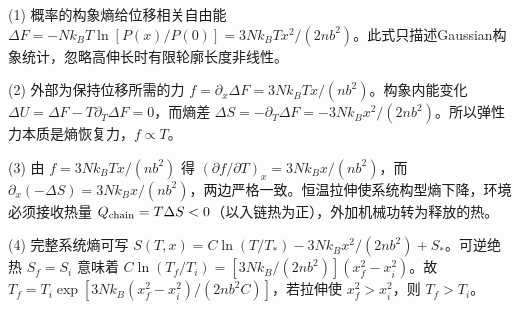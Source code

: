 (1) 概率的构象熵给位移相关自由能 \(\Delta F=-Nk_BT\ln[P(x)/P(0)]=3Nk_BT x^2/(2nb^2)\)。此式只描述Gaussian构象统计，忽略高伸长时有限轮廓长度非线性。

(2) 外部为保持位移所需的力 \(f=\partial_x\Delta F=3Nk_BTx/(nb^2)\)。构象内能变化 \(\Delta U=\Delta F-T\partial_T\Delta F=0\)，而熵差 \(\Delta S=-\partial_T\Delta F=-3Nk_B x^2/(2nb^2)\)。所以弹性力本质是熵恢复力，\(f\propto T\)。

(3) 由 \(f=3Nk_BTx/(nb^2)\) 得 \((\partial f/\partial T)_x=3Nk_Bx/(nb^2)\)，而 \(\partial_x(-\Delta S)=3Nk_Bx/(nb^2)\)，两边严格一致。恒温拉伸使系统构型熵下降，环境必须接收热量 \(Q_{\rm chain}=T\Delta S<0\)（以入链热为正），外加机械功转为释放的热。

(4) 完整系统熵可写 \(S(T,x)=C\ln(T/T_*)-3Nk_Bx^2/(2nb^2)+S_*\)。可逆绝热 \(S_f=S_i\) 意味着 \(C\ln(T_f/T_i)=[3Nk_B/(2nb^2)](x_f^2-x_i^2)\)。故 \(T_f=T_i\exp[3Nk_B(x_f^2-x_i^2)/(2nb^2C)]\)，若拉伸使 \(x_f^2>x_i^2\)，则 \(T_f>T_i\)。
